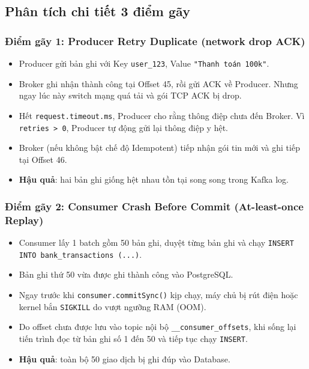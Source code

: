 \documentclass[12pt]{article}
\begin{document}
\subsection{Phân tích chi tiết 3 điểm gãy}

\subsubsection{Điểm gãy 1: Producer Retry Duplicate (network drop ACK)}
\begin{itemize}
    \item Producer gửi bản ghi với Key \texttt{user\_123}, Value \texttt{"Thanh toán 100k"}.
    \item Broker ghi nhận thành công tại Offset 45, rồi gửi ACK về Producer. Nhưng ngay lúc này switch mạng quá tải và gói TCP ACK bị drop.
    \item Hết \texttt{request.timeout.ms}, Producer cho rằng thông điệp chưa đến Broker. Vì \texttt{retries > 0}, Producer tự động gửi lại thông điệp y hệt.
    \item Broker (nếu không bật chế độ Idempotent) tiếp nhận gói tin mới và ghi tiếp tại Offset 46.
    \item \textbf{Hậu quả}: hai bản ghi giống hệt nhau tồn tại song song trong Kafka log.
\end{itemize}

\subsubsection{Điểm gãy 2: Consumer Crash Before Commit (At-least-once Replay)}
\begin{itemize}
    \item Consumer lấy 1 batch gồm 50 bản ghi, duyệt từng bản ghi và chạy \texttt{INSERT INTO bank\_transactions (...)}.
    \item Bản ghi thứ 50 vừa được ghi thành công vào PostgreSQL.
    \item Ngay trước khi \texttt{consumer.commitSync()} kịp chạy, máy chủ bị rút điện hoặc kernel bắn \texttt{SIGKILL} do vượt ngưỡng RAM (OOM).
    \item Do offset chưa được lưu vào topic nội bộ \texttt{\_\_consumer\_offsets}, khi sống lại tiến trình đọc từ bản ghi số 1 đến 50 và tiếp tục chạy \texttt{INSERT}.
    \item \textbf{Hậu quả}: toàn bộ 50 giao dịch bị ghi đúp vào Database.
\end{itemize}
\end{document}
